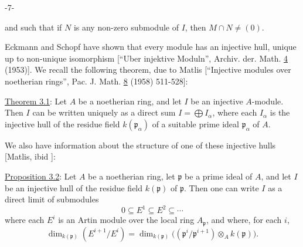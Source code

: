 \begin{center}-7-\end{center}

and such that if $N$ is any non-zero submodule of $I$, then $M\cap N\neq(0)$.

Eckmann and Schopf have shown that every module has an injective hull, unique up to non-unique isomorphism [``Uber injektive Moduln'', Archiv. der. Math. \uline{4} (1953)]. We recall the following theorem, due to Matlis [``Injective modules over noetherian rings'', Pac. J. Math. \uline{8} (1958) 511-528]:

\uline{Theorem 3.1}: Let $A$ be a noetherian ring, and let $I$ be an injective $A$-module. Then $I$ can be written uniquely as a direct sum $I=\bigoplus I_\alpha$, where each $I_\alpha$ is the injective hull of the residue field $k(\mathfrak p_\alpha)$ of a suitable prime ideal $\mathfrak p_\alpha$ of $A$.

We also have information about the structure of one of these injective hulls [Matlis, ibid ]:

\uline{Proposition 3.2}: Let $A$ be a noetherian ring, let $\mathfrak p$ be a prime ideal of $A$, and let $I$ be an injective hull of the residue field $k(\mathfrak p)$ of $\mathfrak p$. Then one can write $I$ as a direct limit of submodules
\[
0\subseteq E^1\subseteq E^2\subseteq\cdots
\]
where each $E^i$ is an Artin module over the local ring $A_{\mathfrak p}$, and where, for each $i$,
\[
\dim_{k(\mathfrak p)}(E^{i+1}/E^i)=\dim_{k(\mathfrak p)}\bigl((\mathfrak p^i/\mathfrak p^{i+1})\otimes_A k(\mathfrak p)\bigr).
\]
